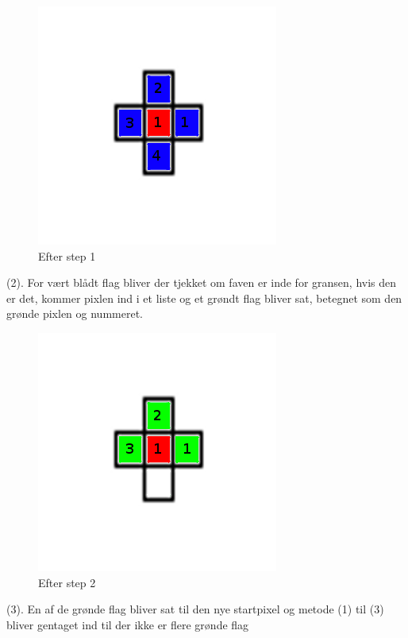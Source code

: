 \begin{figure}[h]
	\begin{center}
		\includegraphics[scale=0.42,angle=0]{afsnit/vores_implementation/billeder/flood_fill/floodfill2}
	\end{center}
	\caption[]{Efter step 1}
	\label{floodfill2}
\end{figure}

(2). For vært blådt flag bliver der tjekket om faven er inde for gransen, hvis den er det, kommer pixlen ind i et liste og et grøndt flag bliver sat, betegnet som den grønde pixlen og nummeret.

\begin{figure}[h]
	\begin{center}
		\includegraphics[scale=0.42,angle=0]{afsnit/vores_implementation/billeder/flood_fill/floodfill3}
	\end{center}
	\caption[]{Efter step 2}
	\label{floodfill3}
\end{figure}

(3). En af de grønde flag bliver sat til den nye startpixel og metode (1) til (3) bliver gentaget ind til der ikke er flere grønde flag 

